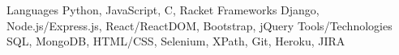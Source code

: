 
\begin{cvskills}
  \cvskill
    {Languages} %
    {Python, JavaScript, C, Racket} %
  \cvskill
    {Frameworks} %
    {Django, Node.js/Express.js, React/ReactDOM, Bootstrap, jQuery} %
  \cvskill
    {Tools/Technologies} %
    {SQL, MongoDB, HTML/CSS, Selenium, XPath, Git, Heroku, JIRA} %
\end{cvskills}
